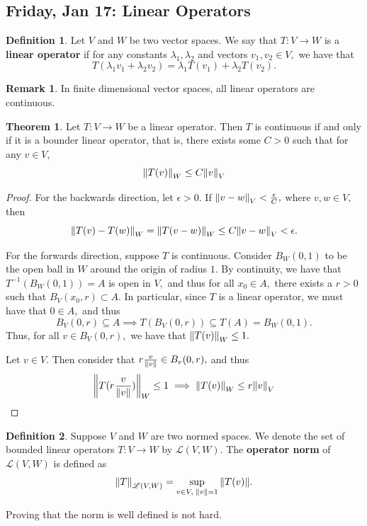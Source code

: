 \documentclass[10pt, oneside]{article}
\theoremstyle{definition}
\newtheorem{thm}{Theorem}
\newtheorem{defn}{Definition}
\newtheorem{rem}{Remark}
\begin{document}
\subsection{Friday, Jan 17: Linear Operators}
\begin{defn}
    Let $V$ and $W$ be two vector spaces. We say that $T: V\to W$ is a \textbf{linear operator} if for any constants $\lambda_1, \lambda_2$ and vectors $v_1, v_2 \in V,$ we have that 
    \[T(\lambda_1v_1 + \lambda_2v_2) = \lambda_1 T(v_1) + \lambda_2 T(v_2).\]
\end{defn}
\begin{rem}
    In finite dimensional vector spaces, all linear operators are continuous.
\end{rem}
\begin{thm}
    Let $T: V\to W$ be a linear operator. Then $T$ is continuous if and only if it is a bounder linear operator, that is, there exists some $C>0$ such that for any $v\in V,$ 
    \[\norm{T(v)}_W\leq C\norm{v}_V\]
\end{thm}
\begin{proof}
    For the backwards direction, let $\epsilon>0.$ If $\norm{v - w}_V< \frac{\epsilon}{C},$ where $v,w \in V,$ then 
    \[\norm{T(v) - T(w)}_W = \norm{T(v-w)}_W \leq C\norm{v-w}_V < \epsilon.\]

    For the forwards direction, suppose $T$ is continuous. Consider $B_W(0,1)$ to be the open ball in $W$ around the origin of radius $1.$ By continuity, we have that $T^{-1}(B_W(0,1)) = A$ is open in $V,$ and thus for all $x_0 \in A,$ there exists a $r>0$ such that $B_V(x_0, r) \subset A.$ In particular, since $T$ is a linear operator, we must have that $0 \in A,$ and thus  
    \[B_V(0,r)\subseteq A \implies T(B_V(0,r)) \subseteq T(A) = B_W(0,1).\] Thus, for all $v\in B_V(0,r),$ we have that $\norm{T(v)}_W \leq 1.$ 

    Let $v \in V.$ Then consider that $r\frac{v}{\norm{v}} \in B_v(0,r),$ and thus 
    \[\norm{T(r \frac{v}{\norm{v}})}_W \leq 1 \implies \norm{T(v)}_W \leq r\norm{v}_V\]
\end{proof}

\begin{defn}
    Suppose $V$ and $W$ are two normed spaces. We denote the set of bounded linear operators $T: V\to W$ by $\mathcal{L}(V,W).$ The \textbf{operator norm} of $\mathcal{L}(V,W)$ is defined as 
    \[\norm{T}_{\mathcal{L}(V,W)} = \sup_{v \in V, \; \norm{v} = 1}\|T(v)\|.\] 
\end{defn}
Proving that the norm is well defined is not hard.
\end{document}

